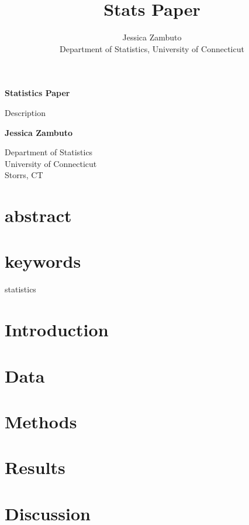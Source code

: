\documentclass[12pt]{article}
\title{Stats Paper}
\author{Jessica Zambuto\\
Department of Statistics, University of Connecticut}
\begin{document}
\begin{titlepage}
	\begin{center}
		\vspace*{1cm}
      		 \Huge
       		\textbf{Statistics Paper}

     		 \Large
      		 \vspace{0.5cm}
        		Description
            
      		 \vspace{1.5cm}

      		 \textbf{Jessica Zambuto}
       
       		\vfill

              
       		 \Large    
      		Department of Statistics\\
       		University of Connecticut\\
       		Storrs, CT\\
            
   \end{center}
\end{titlepage}

\section*{abstract}
\section*{keywords}
statistics

\section{Introduction}


\section{Data}

\section{Methods}

\section{Results}

\section{Discussion}
\end{document}
